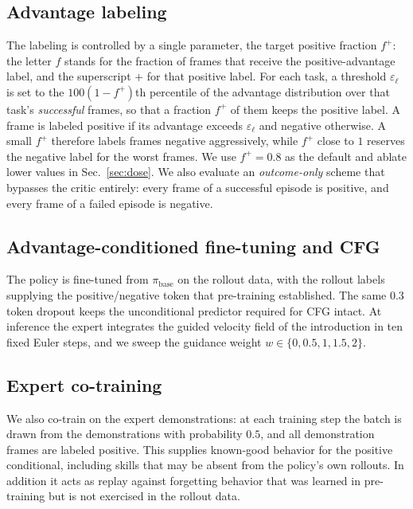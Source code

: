 \documentclass[conference]{IEEEtran}
\newcommand{\pf}{\ensuremath{f^{+}}}   %
\begin{document}
\subsection{Advantage labeling}
The labeling is controlled by a single parameter, the target positive fraction \pf{}: the
letter $f$ stands for the fraction of frames that receive the positive-advantage label,
and the superscript $+$ for that positive label. For each task, a threshold
$\varepsilon_\ell$ is set to the $100(1-\pf)$th percentile of the advantage distribution
over that task's \emph{successful} frames, so that a fraction \pf{} of them keeps the
positive label. A frame is labeled positive if its advantage exceeds $\varepsilon_\ell$ and
negative otherwise. A small \pf{} therefore labels frames negative aggressively, while
$\pf{}$ close to $1$ reserves the negative label for the worst frames. We use $\pf{=}0.8$
as the default and ablate lower values in Sec.~\ref{sec:dose}. We also evaluate an
\emph{outcome-only} scheme that bypasses the critic entirely: every frame of a successful
episode is positive, and every frame of a failed episode is negative.

\subsection{Advantage-conditioned fine-tuning and CFG}
The policy is fine-tuned from $\pi_{\text{base}}$ on the rollout data, with the rollout
labels supplying the positive/negative token that pre-training established. The same $0.3$
token dropout keeps the unconditional predictor required for CFG intact. At inference the
expert integrates the guided velocity field of the introduction in ten fixed Euler steps,
and we sweep the guidance weight $w\in\{0,0.5,1,1.5,2\}$.

\subsection{Expert co-training}
We also co-train on the expert demonstrations: at each training step the batch is drawn
from the demonstrations with probability $0.5$, and all demonstration frames are labeled
positive. This supplies known-good behavior for the positive conditional, including skills
that may be absent from the policy's own rollouts. In addition it acts as replay against
forgetting behavior that was learned in pre-training but is not exercised in the rollout
data.
\end{document}
